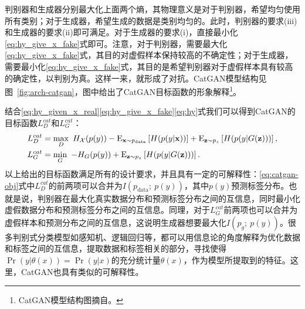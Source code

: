 判别器和生成器分别最大化上面两个熵，其物理意义是对于判别器，希望均匀使用所有类别；对于生成器，希望生成的数据是类别均匀的。此时，判别器的要求(iii)和生成器的要求(ii)即可满足。对于生成器的要求(i)，直接最小化\eqref{eq:hy_give_x_fake}式即可。注意，对于判别器，需要最大化\eqref{eq:hy_give_x_fake}式，其目的对虚假样本保持较高的不确定性；对于生成器，需要最小化\eqref{eq:hy_give_x_fake}式，其目的是希望判别器对于虚假样本具有较高的确定性，以判别为真。这样一来，就形成了对抗。CatGAN模型结构见图~\ref{fig:arch-catgan}，图中给出了CatGAN目标函数的形象解释\footnote{CatGAN模型结构图摘自\citet{springenberg2015unsupervised}。}。

结合\eqref{eq:hy_given_x_real}\eqref{eq:hy_give_x_fake}\eqref{eq:hy}式我们可以得到CatGAN的目标函数$L_D^{cat}$和$L_G^{cat}$：
\begin{equation}
  \begin{split}
    L_D^{cat} &= \max_D ~H_{\mathcal{X}}(p(y)) 
    - \text{E}_{\mathbf{x}\sim p_{\text{data}}} \left[ H(p(y|\mathbf{x})) \right]
    + \text{E}_{\mathbf{z} \sim p_z}\left[ H(p(y|G(\mathbf{z}))) \right], \\
    L_G^{cat} &= \min_G ~-H_{G}(p(y)) 
    + \text{E}_{\mathbf{z} \sim p_z}\left[ H(p(y|G(\mathbf{z}))) \right].
  \end{split}
  \label{eq:catgan-obj}
\end{equation}
以上给出的目标函数满足所有的设计要求，并且具有一定的可解释性：\eqref{eq:catgan-obj}式中$L_D^{cat}$的前两项可以合并为$I(p_{\text{data}};~p(y))$，其中$p(y)$预测标签分布。也就是说，判别器在最大化真实数据分布和预测标签分布之间的互信息，同时最小化虚假数据分布和预测标签分布之间的互信息。同理，对于$L_G^{cat}$前两项也可以合并为虚假样本和预测分布之间的互信息，这说明生成器想要最大化$I(p_g; ~p(y))$。很多判别式分类模型如感知机、逻辑回归等，都可以用信息论的角度解释为优化数据和标签之间的互信息，提取数据和标签相关的部分，寻找使得$\Pr(y|\theta(x)) = \Pr(y|x)$的充分统计量$\theta(x)$，作为模型所提取到的特征。这里，CatGAN也具有类似的可解释性。

